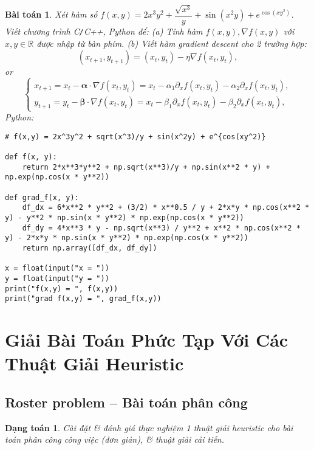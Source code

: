 \documentclass{article}
\newtheorem{baitoan}{Bài toán}
\newtheorem{dangtoan}{Dạng toán}
\begin{document}
\begin{baitoan}
	Xét hàm số $f(x,y) = 2x^3y^2 + \dfrac{\sqrt{x^3}}{y} + \sin(x^2y) + e^{\cos(xy^2)}$. Viết chương trình {\sf C{\tt/}C++, Python} để: (a) Tính hàm $f(x,y),\nabla f(x,y)$ với $x,y\in\mathbb{R}$ được nhập từ bàn phím. (b) Viết hàm gradient descent cho 2 trường hợp:
	\begin{equation*}
		(x_{t+1},y_{t+1}) = (x_t,y_t) - \eta\nabla f(x_t,y_t),
	\end{equation*}
	or
	\begin{equation*}
		\left\{\begin{split}
			x_{t+1} = x_t - \boldsymbol{\alpha}\cdot\nabla f(x_t,y_t) = x_t - \alpha_1\partial_xf(x_t,y_t) - \alpha_2\partial_xf(x_t,y_t),\\
			y_{t+1} = y_t - \boldsymbol{\beta}\cdot\nabla f(x_t,y_t) = x_t - \beta_1\partial_xf(x_t,y_t) - \beta_2\partial_xf(x_t,y_t),
		\end{split}\right.
	\end{equation*}
	Python:
	\begin{verbatim}
# f(x,y) = 2x^3y^2 + sqrt(x^3)/y + sin(x^2y) + e^{cos(xy^2)}

def f(x, y):
    return 2*x**3*y**2 + np.sqrt(x**3)/y + np.sin(x**2 * y) + np.exp(np.cos(x * y**2))

def grad_f(x, y):
    df_dx = 6*x**2 * y**2 + (3/2) * x**0.5 / y + 2*x*y * np.cos(x**2 * y) - y**2 * np.sin(x * y**2) * np.exp(np.cos(x * y**2))
    df_dy = 4*x**3 * y - np.sqrt(x**3) / y**2 + x**2 * np.cos(x**2 * y) - 2*x*y * np.sin(x * y**2) * np.exp(np.cos(x * y**2))
    return np.array([df_dx, df_dy])

x = float(input("x = "))
y = float(input("y = "))
print("f(x,y) = ", f(x,y))
print("grad f(x,y) = ", grad_f(x,y))
	\end{verbatim}
\end{baitoan}


\section{Giải Bài Toán Phức Tạp Với Các Thuật Giải Heuristic}

\subsection{Roster problem -- Bài toán phân công}

\begin{dangtoan}
	Cài đặt \& đánh giá thực nghiệm 1 thuật giải heuristic cho bài toán phân công công việc (đơn giản), \& thuật giải cải tiến.
\end{dangtoan}
\end{document}
